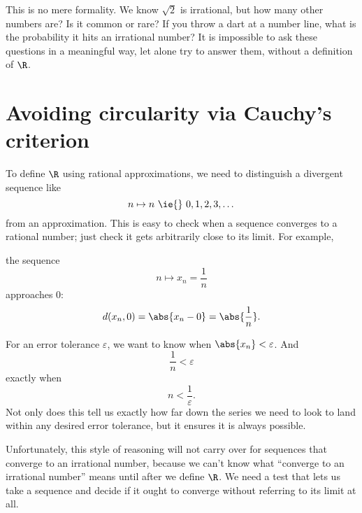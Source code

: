 \documentclass{scrartcl}
\def\epsilon{\varepsilon}
\newcommand{\dist}{d}
\begin{document}
This is no mere formality. We know \(\sqrt 2\) is irrational, but how many other numbers are? Is it common or rare? If you throw a dart at a number line, what is the probability it hits an irrational number? It is impossible to ask these questions in a meaningful way, let alone try to answer them, without a definition of \(\R\).

\section{Avoiding circularity via Cauchy's criterion}
To define \(\R\) using rational approximations, we need to distinguish a divergent sequence like
\[
  n\mapsto n \textrm{ \ie{} } 0,1,2,3,\dots
\]
from an approximation. This is easy to check when a sequence converges to a rational number; just check it gets arbitrarily close to its limit. For example,

\begin{example}
the sequence
\[
  n\mapsto x_{n}= \frac1n
\]
approaches \(0\):
\[
  \dist(x_{n},0) = \abs{x_{n}-0} = \abs{\frac 1 n}.
\]

For an error tolerance \(\epsilon\), we want to know when \(\abs{x_{n}} < \epsilon\). And
\[
  \frac 1 n < \epsilon
\]
exactly when
\[
  n < \frac 1 \epsilon.
\]
Not only does this tell us exactly how far down the series we need to look to land within any desired error tolerance, but it ensures it is always possible.
\end{example}

Unfortunately, this style of reasoning will not carry over for sequences that converge to an irrational number, because we can't know what ``converge to an irrational number'' means until after we define \(\R\). We need a test that lets us take a sequence and decide if it ought to converge without referring to its limit at all.
\end{document}

